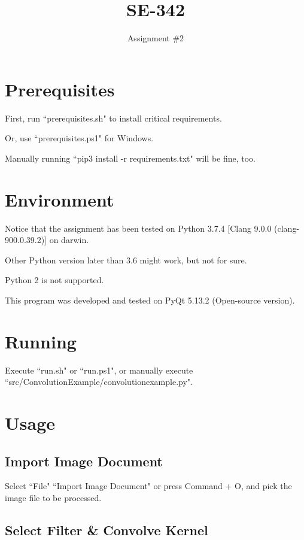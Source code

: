 \documentclass[11pt, oneside]{article}   	%
\title{SE-342}
\author{Assignment \#2}
\date{}							%
\begin{document}
\maketitle
\section*{Prerequisites}

\hspace{14pt} First, run ``prerequisites.sh" to install critical requirements.

Or, use ``prerequisites.ps1" for Windows.

Manually running ``pip3 install -r requirements.txt" will be fine, too.

\section*{Environment}

\hspace{13pt} Notice that the assignment has been tested on Python 3.7.4 [Clang 9.0.0 (clang-900.0.39.2)] on darwin.

Other Python version later than 3.6 might work, but not for sure.

Python 2 is not supported.

This program was developed and tested on PyQt 5.13.2 (Open-source version).

\section*{Running}

\hspace{14pt} Execute ``run.sh" or ``run.ps1", or manually execute ``src/ConvolutionExample/convolutionexample.py".

\section*{Usage}

\subsection*{Import Image Document}

\hspace{14pt} Select ``File" \- ``Import Image Document" or press Command + O, and pick the image file to be processed.

\subsection*{Select Filter \& Convolve Kernel}
\end{document}
